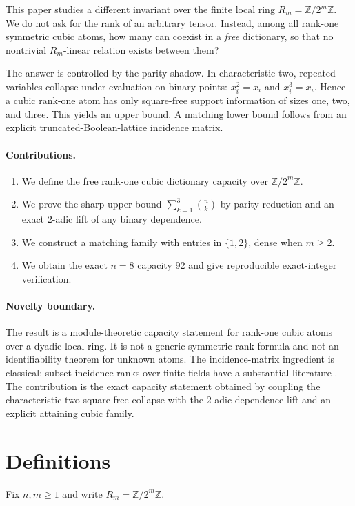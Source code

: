 \documentclass[11pt]{article}
\theoremstyle{definition}
\newcommand{\Z}{\mathbb Z}
\begin{document}
This paper studies a different invariant over the finite local ring \(R_m=\Z/2^m\Z\). We do not ask for the rank of an arbitrary tensor. Instead, among all rank-one symmetric cubic atoms, how many can coexist in a \emph{free} dictionary, so that no nontrivial \(R_m\)-linear relation exists between them?

The answer is controlled by the parity shadow. In characteristic two, repeated variables collapse under evaluation on binary points: \(x_i^2=x_i\) and \(x_i^3=x_i\). Hence a cubic rank-one atom has only square-free support information of sizes one, two, and three. This yields an upper bound. A matching lower bound follows from an explicit truncated-Boolean-lattice incidence matrix.

\paragraph{Contributions.}
\begin{enumerate}[leftmargin=*]
\item We define the free rank-one cubic dictionary capacity over \(\Z/2^m\Z\).
\item We prove the sharp upper bound \(\sum_{k=1}^{3}\binom nk\) by parity reduction and an exact \(2\)-adic lift of any binary dependence.
\item We construct a matching family with entries in \(\{1,2\}\), dense when \(m\ge2\).
\item We obtain the exact \(n=8\) capacity \(92\) and give reproducible exact-integer verification.
\end{enumerate}

\paragraph{Novelty boundary.}
The result is a module-theoretic capacity statement for rank-one cubic atoms over a dyadic local ring. It is not a generic symmetric-rank formula and not an identifiability theorem for unknown atoms. The incidence-matrix ingredient is classical; subset-incidence ranks over finite fields have a substantial literature \cite{LinialRothschild1981}. The contribution is the exact capacity statement obtained by coupling the characteristic-two square-free collapse with the \(2\)-adic dependence lift and an explicit attaining cubic family.

\section{Definitions}
Fix \(n,m\ge1\) and write \(R_m=\Z/2^m\Z\).
\end{document}
